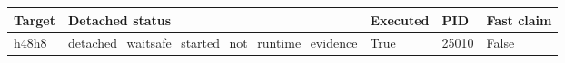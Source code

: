 {\small
\begin{tabular}{lllll}
\hline
Target & Detached status & Executed & PID & Fast claim \\
\hline
h48h8 & detached\_waitsafe\_started\_not\_runtime\_evidence & True & 25010 & False \\
\hline
\end{tabular}
}

